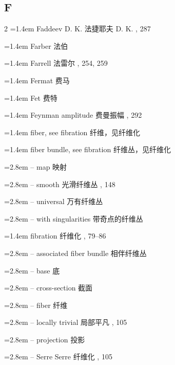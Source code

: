 \subsection*{F}
\small
\begin{multicols}{2}
\noindent\hangindent=1.4em Faddeev D. K. \quad 法捷耶夫 D. K. , 287\par
\noindent\hangindent=1.4em Farber \quad 法伯 \par
\noindent\hangindent=1.4em Farrell \quad 法雷尔 , 254, 259\par
\noindent\hangindent=1.4em Fermat \quad 费马 \par
\noindent\hangindent=1.4em Fet \quad 费特 \par
\noindent\hangindent=1.4em Feynman amplitude \quad 费曼振幅 , 292\par
\noindent\hangindent=1.4em fiber, see fibration \quad 纤维，见纤维化 \quad\par
\noindent\hangindent=1.4em fiber bundle, see fibration \quad 纤维丛，见纤维化 \par
\noindent\hangindent=2.8em -- map \quad 映射 \par
\noindent\hangindent=2.8em -- smooth \quad 光滑纤维丛 , 148\par
\noindent\hangindent=2.8em -- universal \quad 万有纤维丛 \par
\noindent\hangindent=2.8em -- with singularities \quad 带奇点的纤维丛 \par
\noindent\hangindent=1.4em fibration \quad 纤维化 , 79--86\par
\noindent\hangindent=2.8em -- associated fiber bundle \quad 相伴纤维丛 \par
\noindent\hangindent=2.8em -- base \quad 底 \par
\noindent\hangindent=2.8em -- cross-section \quad 截面 \par
\noindent\hangindent=2.8em -- fiber \quad 纤维 \par
\noindent\hangindent=2.8em -- locally trivial \quad 局部平凡 , 105\par
\noindent\hangindent=2.8em -- projection \quad 投影 \par
\noindent\hangindent=2.8em -- Serre \quad Serre 纤维化 , 105\par

\end{multicols}
